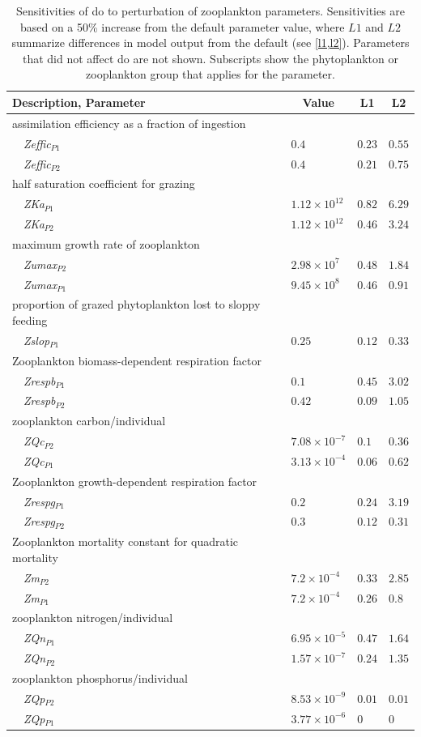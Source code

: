 \documentclass[letterpaper,12pt,oneside]{article}\usepackage[]{graphicx}\usepackage[]{color}
\begin{document}
\begin{table}[!tbp]
{\normalsize
\caption{Sensitivities of \ac{do} to perturbation of zooplankton parameters.  Sensitivities are based on a 50\% increase from the default parameter value, where $L1$ and $L2$ summarize differences in model output from the default (see \cref{l1,l2}).  Parameters that did not affect \ac{do} are not shown.  Subscripts show the phytoplankton or zooplankton group that applies for the parameter.\label{tab:zoopsens}} 
\begin{center}
\begin{tabular}{llll}
\hline\hline
\multicolumn{1}{l}{Description, Parameter}&\multicolumn{1}{c}{Value}&\multicolumn{1}{c}{L1}&\multicolumn{1}{c}{L2}\tabularnewline
\hline
{assimilation efficiency as a fraction of ingestion}&&&\tabularnewline
~~\textit{Zeffic$_{P1}$}&$0.4$&$0.23$&$0.55$\tabularnewline
~~\textit{Zeffic$_{P2}$}&$0.4$&$0.21$&$0.75$\tabularnewline
\hline
{half saturation coefficient for grazing}&&&\tabularnewline
~~\textit{ZKa$_{P1}$}&$1.12\times 10^{12}$&$0.82$&$6.29$\tabularnewline
~~\textit{ZKa$_{P2}$}&$1.12\times 10^{12}$&$0.46$&$3.24$\tabularnewline
\hline
{maximum growth rate of zooplankton}&&&\tabularnewline
~~\textit{Zumax$_{P2}$}&$2.98\times 10^{7}$&$0.48$&$1.84$\tabularnewline
~~\textit{Zumax$_{P1}$}&$9.45\times 10^{8}$&$0.46$&$0.91$\tabularnewline
\hline
{proportion of grazed phytoplankton lost to sloppy feeding}&&&\tabularnewline
~~\textit{Zslop$_{P1}$}&$0.25$&$0.12$&$0.33$\tabularnewline
\hline
{Zooplankton biomass-dependent respiration factor}&&&\tabularnewline
~~\textit{Zrespb$_{P1}$}&$0.1$&$0.45$&$3.02$\tabularnewline
~~\textit{Zrespb$_{P2}$}&$0.42$&$0.09$&$1.05$\tabularnewline
\hline
{zooplankton carbon/individual}&&&\tabularnewline
~~\textit{ZQc$_{P2}$}&$7.08\times 10^{-7}$&$0.1$&$0.36$\tabularnewline
~~\textit{ZQc$_{P1}$}&$3.13\times 10^{-4}$&$0.06$&$0.62$\tabularnewline
\hline
{Zooplankton growth-dependent respiration factor}&&&\tabularnewline
~~\textit{Zrespg$_{P1}$}&$0.2$&$0.24$&$3.19$\tabularnewline
~~\textit{Zrespg$_{P2}$}&$0.3$&$0.12$&$0.31$\tabularnewline
\hline
{Zooplankton mortality constant for quadratic mortality}&&&\tabularnewline
~~\textit{Zm$_{P2}$}&$7.2\times 10^{-4}$&$0.33$&$2.85$\tabularnewline
~~\textit{Zm$_{P1}$}&$7.2\times 10^{-4}$&$0.26$&$0.8$\tabularnewline
\hline
{zooplankton nitrogen/individual}&&&\tabularnewline
~~\textit{ZQn$_{P1}$}&$6.95\times 10^{-5}$&$0.47$&$1.64$\tabularnewline
~~\textit{ZQn$_{P2}$}&$1.57\times 10^{-7}$&$0.24$&$1.35$\tabularnewline
\hline
{zooplankton phosphorus/individual}&&&\tabularnewline
~~\textit{ZQp$_{P2}$}&$8.53\times 10^{-9}$&$0.01$&$0.01$\tabularnewline
~~\textit{ZQp$_{P1}$}&$3.77\times 10^{-6}$&$0$&$0$\tabularnewline
\hline
\end{tabular}\end{center}}

\end{table}
\end{document}

